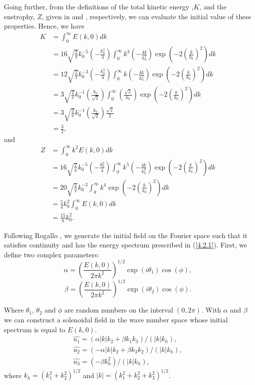 Going further, from the definitions of the total kinetic energy ,$K$, and the enstrophy, $Z$, given in  and , respectively, we can evaluate the initial value of these properties. Hence, we have
\begin{align}
\label{eq-DHIT_intial_K}
K&=\int_0^\infty E(k,0)dk\\\nonumber
&=16\sqrt{\frac{2}{\pi}}k_0^{-5}\left(-\frac{k_0^2}{4}\right)\int_0^\infty k^3\left(-\frac{4k}{k_0^2}\right)\exp\left(-2\left(\frac{k}{k_0}\right)^2\right)dk\\\nonumber
&=12\sqrt{\frac{2}{\pi}}k_0^{-3}\left(-\frac{k_0^2}{4}\right)\int_0^\infty k\left(-\frac{4k}{k_0^2}\right)\exp\left(-2\left(\frac{k}{k_0}\right)^2\right)dk\\\nonumber
&=3\sqrt{\frac{2}{\pi}}k_0^{-1}\left(\frac{k_0}{\sqrt{2}}\right)\int_0^\infty\left(\frac{\sqrt{2}}{k_0}\right)\exp\left(-2\left(\frac{k}{k_0}\right)^2\right)dk\\\nonumber
&=3\sqrt{\frac{2}{\pi}}k_0^{-1}\left(\frac{k_0}{\sqrt{2}}\right)\frac{\sqrt{2}}{2}\\\nonumber
&=\frac{3}{2},
\end{align}
and
\begin{align}
\label{eq-DHIT_inital_Z}
Z&=\int_0^\infty k^2E(k,0)dk\\\nonumber
&=16\sqrt{\frac{2}{\pi}}k_0^{-5}\left(-\frac{k_0^2}{4}\right)\int_0^\infty k^5\left(-\frac{4k}{k_0^2}\right)\exp\left(-2\left(\frac{k}{k_0}\right)^2\right)dk\\\nonumber
&=20\sqrt{\frac{2}{\pi}}k_0^{-3}\int_0^\infty k^4\exp\left(-2\left(\frac{k}{k_0}\right)^2\right)dk\\\nonumber
&=\frac{5}{4}k_0^2\int_0^\infty E(k,0)dk\\\nonumber
&=\frac{15}{8}k_0^2.
\end{align}

Following Rogallo \cite{rogallo_numerical_1981}, we generate the initial field on the Fourier space such that it satisfies continuity and has the energy spectrum prescribed in (\ref{4.2.1}). First, we define two complex parameters:
$$\alpha=\left(\frac{E(k,0)}{2\pi k^2}\right)^{1/2}\exp(i\theta_1)\cos(\phi),$$
$$\beta=\left(\frac{E(k,0)}{2\pi k^2}\right)^{1/2}\exp(i\theta_2)\cos(\phi).$$

Where $\theta_1$, $\theta_2$ and $\phi$ are random numbers on the interval $(0,2\pi)$. With $\alpha$ and $\beta$ we can construct a solenoidal field in the wave number space whose initial spectrum is equal to $E(k,0)$.
\begin{align}
\label{eq-DHIT_initial_u_fourier}
\hat{u_1}=(\alpha|k|k_2+\beta k_1k_3)/(|k|k_h),\\\nonumber
\hat{u_2}=(-\alpha|k|k_2+\beta k_3k_2)/(|k|k_h),\\\nonumber
\hat{u_3}=(-\beta k_h^2)/(|k|k_h),
\end{align}
where $k_h=\left(k_1^2+k_2^2\right)^{1/2}$ and $|k|=\left(k_1^2+k_2^2+k_3^2\right)^{1/2}$.

